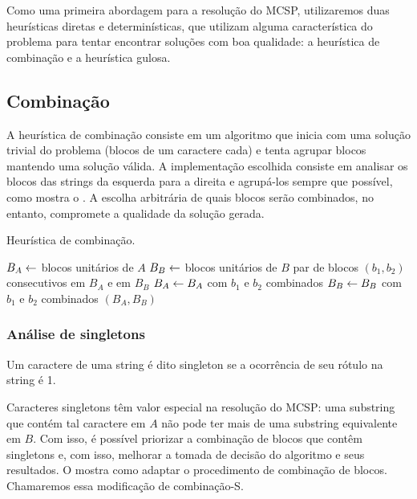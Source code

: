 Como uma primeira abordagem para a resolução do MCSP, utilizaremos duas heurísticas diretas e determinísticas, que utilizam alguma característica do problema para tentar encontrar soluções com boa qualidade: a heurística de combinação e a heurística gulosa.

\subsection{Combinação}

    A heurística de combinação consiste em um algoritmo que inicia com uma solução trivial do problema (blocos de um caractere cada) e tenta agrupar blocos mantendo uma solução válida. A implementação escolhida consiste em analisar os blocos das strings da esquerda para a direita e agrupá-los sempre que possível, como mostra o . A escolha arbitrária de quais blocos serão combinados, no entanto, compromete a qualidade da solução gerada.

    \begin{algorithm}[htb]
        \caption{Heurística de combinação.} \label{alg:combine}
        \begin{codebox}
        \li $B_A \leftarrow$ blocos unitários de $A$
        \li $B_B \leftarrow$ blocos unitários de $B$
        \li \Para \Cada par de blocos $(b_1, b_2)$ consecutivos em $B_A$ e em $B_B$ \Faca
            \Do
        \li     $B_A \leftarrow B_A$ com $b_1$ e $b_2$ combinados
        \li     $B_B \leftarrow B_B$ com $b_1$ e $b_2$ combinados
            \End
        \li \Devolva $(B_A, B_B)$
        \end{codebox}
    \end{algorithm}

    \subsubsection{Análise de singletons}

        \begin{definition}[Singleton]
            Um caractere de uma string é dito singleton se a ocorrência de seu rótulo na string é 1.
        \end{definition}

        Caracteres singletons têm valor especial na resolução do MCSP: uma substring que contém tal caractere em $A$ não pode ter mais de uma substring equivalente em $B$. Com isso, é possível priorizar a combinação de blocos que contêm singletons e, com isso, melhorar a tomada de decisão do algoritmo e seus resultados. O  mostra como adaptar o procedimento de combinação de blocos. Chamaremos essa modificação de combinação-S.

